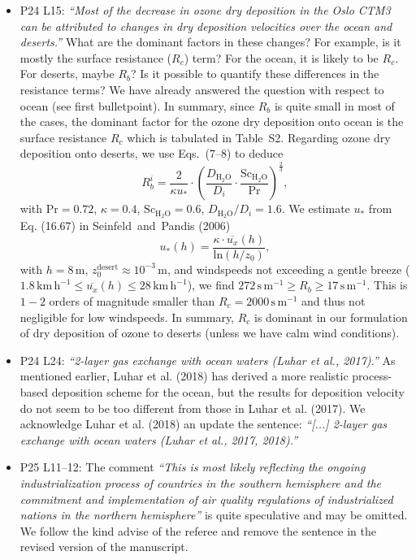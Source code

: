 \documentclass{scrartcl}
\begin{document}
\begin{itemize}
\item {\color{blue}  P24 L15: \emph{“Most of the decrease in ozone dry deposition in the Oslo CTM3
can be attributed to changes in dry deposition velocities over the ocean and deserts.”}
What are the dominant factors in these changes? For example, is it mostly the surface
resistance ($R_c$) term? For the ocean, it is likely to be $R_c$. For deserts, maybe $R_b$? Is it
possible to quantify these differences in the resistance terms?}
  We have already answered the question with respect to ocean (see first bulletpoint). In summary, since $R_b$ is quite small in most of the cases, the dominant factor for the ozone dry deposition onto ocean is the surface resistance $R_c$ which is tabulated in Table~S2. Regarding ozone dry deposition onto deserts, we use Eqs.~(7--8) to deduce
  \begin{equation}
    R_b^i = \frac{2}{\kappa u_*} \cdot \left(\frac{D_\mathrm{H_2O}}{D_i} \cdot \frac{\mathrm{Sc}_\mathrm{H_2O}}{\mathrm{Pr}}\right)^{\frac{2}{3}},
  \end{equation}
  with $\mathrm{Pr}=0.72$, $\kappa=0.4$, $\mathrm{Sc}_\mathrm{H_2O} = 0.6$, $D_\mathrm{H_2O}/D_i = 1.6$.
  We estimate $u_*$ from Eq. (16.67) in Seinfeld~and~Pandis (2006)
  \begin{equation}
    u_*(h) = \frac{\kappa\cdot \overline{u_x}(h)}{\mathrm{ln}(h/z_0)},
  \end{equation}
  with $h = 8\,\mathrm{m}$, $z_0^\mathrm{desert}\approx 10^{-3}\,\mathrm{m}$, and windspeeds not exceeding a gentle breeze ($1.8\,\mathrm{km\,h^{-1}} \leq \overline{u_x}(h) \leq 28\,\mathrm{km\,h^{-1}}$), we find $272\,\mathrm{s\,m^{-1}} \geq R_b \geq 17\,\mathrm{s\,m^{-1}}$. This is $1-2$ orders of magnitude smaller than $R_c = 2000\,\mathrm{s\,m^{-1}}$ and thus not negligible for low windspeeds. In summary, $R_c$ is dominant in our formulation of dry deposition of ozone to deserts (unless we have calm wind conditions).
  \emph{}
  
\item {\color{blue}  P24 L24: \emph{“2-layer gas exchange with ocean waters (Luhar et al., 2017).”}
As mentioned earlier, Luhar et al. (2018) has derived a more realistic process-based
deposition scheme for the ocean, but the results for deposition velocity do not seem to
be too different from those in Luhar et al. (2017).}
  We acknowledge Luhar et al. (2018) an update the sentence:
  \emph{“[...] 2-layer gas exchange with ocean waters (Luhar et al., 2017, 2018).”}
  
\item {\color{blue}  P25 L11--12: The comment \emph{“This is most likely reflecting the ongoing
industrialization process of countries in the southern hemisphere and the commitment
and implementation of air quality regulations of industrialized nations in the northern
hemisphere”} is quite speculative and may be omitted.}
  We follow the kind advise of the referee and remove the sentence in the revised version of the manuscript.
  

\end{itemize}
\end{document}
